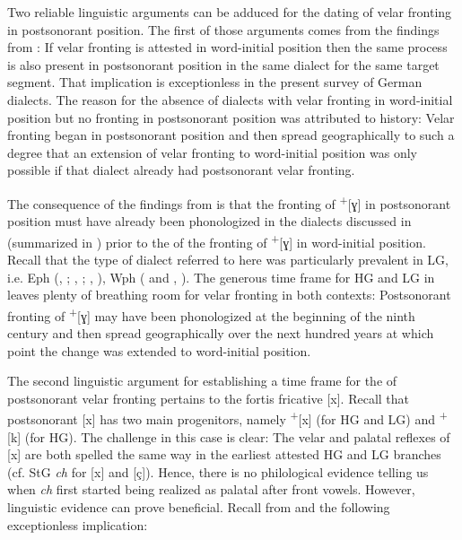 Two reliable linguistic arguments can be adduced for the dating of velar fronting in postsonorant position. The first of those arguments comes from the findings from : If velar fronting is attested in word-initial position then the same process is also present in postsonorant position in the same dialect for the same target segment. That implication is exceptionless in the present survey of German dialects. The reason for the absence of dialects with velar fronting in word-initial position but no fronting in postsonorant position was attributed to history: Velar fronting began in postsonorant position and then spread geographically to such a degree that an extension of velar fronting to word-initial position was only possible if that dialect already had postsonorant velar fronting.

The consequence of the findings from  is that the fronting of  \textsuperscript{+}[ɣ] in postsonorant position must have already been phonologized in the dialects discussed in  (summarized in ) prior to the  of the fronting of  \textsuperscript{+}[ɣ] in word-initial position. Recall that the type of dialect referred to here was particularly prevalent in LG, i.e. Eph (, ; , ; , ), Wph ( and , ). The generous time frame for HG and LG in  leaves plenty of breathing room for velar fronting in both contexts: Postsonorant fronting of  \textsuperscript{+}[ɣ] may have been phonologized at the beginning of the ninth century and then spread geographically over the next hundred years at which point the change was extended to word-initial position.

The second linguistic argument for establishing a time frame for the  of postsonorant velar fronting pertains to the fortis fricative [x]. Recall that postsonorant [x] has two main progenitors, namely  \textsuperscript{+}[x] (for HG and LG) and  \textsuperscript{+}[k] (for HG). The challenge in this case is clear: The velar and palatal reflexes of [x] are both spelled the same way in the earliest attested HG and LG branches (cf. StG \textit{ch} for [x] and [ç]). Hence, there is no philological evidence telling us when \textit{ch} first started being realized as palatal after front vowels. However, linguistic evidence can prove beneficial. Recall from  and  the following exceptionless implication:

